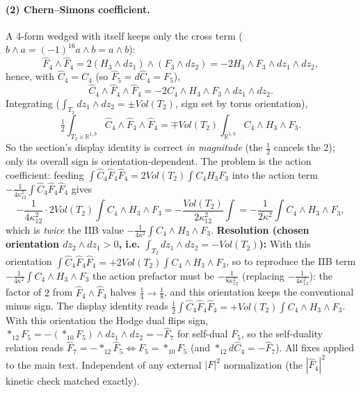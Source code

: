 \paragraph{(2) Chern--Simons coefficient.}
A 4-form wedged with itself keeps only the cross term ($b\wedge a = (-1)^{16}a\wedge b = a\wedge b$):
\begin{equation}
\hat F_4\wedge\hat F_4 = 2 (H_3\wedge dz_1)\wedge(F_3\wedge dz_2)
= -2 H_3\wedge F_3\wedge dz_1\wedge dz_2 ,
\end{equation}
hence, with $\hat C_4 = C_4$ (so $\hat F_5 = d\hat C_4 = F_5$),
\begin{equation}
\hat C_4\wedge\hat F_4\wedge\hat F_4 = -2 C_4\wedge H_3\wedge F_3\wedge dz_1\wedge dz_2 .
\end{equation}
Integrating ($\int_{T_2}dz_1\wedge dz_2 = \pm Vol(T_2)$, sign set by torus orientation),
\begin{equation}
\tfrac12\int_{T_2\times\mathbb R^{1,9}}\hat C_4\wedge\hat F_4\wedge\hat F_4
= \mp Vol(T_2)\int_{\mathbb R^{1,9}} C_4\wedge H_3\wedge F_3 .
\end{equation}
So the section's display identity is correct \emph{in magnitude} (the $\tfrac12$ cancels the $2$); only its overall
sign is orientation-dependent. The problem is the action coefficient: feeding $\int\hat C_4\hat F_4\hat F_4 = 2 Vol(T_2)\int C_4 H_3 F_3$
into the action term $-\tfrac{1}{4\kappa_{12}^2}\int\hat C_4\hat F_4\hat F_4$ gives
\begin{equation}
-\frac{1}{4\kappa_{12}^2}\cdot 2 Vol(T_2)\int C_4\wedge H_3\wedge F_3
= -\frac{Vol(T_2)}{2\kappa_{12}^2}\int = -\frac{1}{2\kappa^2}\int C_4\wedge H_3\wedge F_3 ,
\end{equation}
which is \emph{twice} the IIB value $-\tfrac{1}{4\kappa^2}\int C_4\wedge H_3\wedge F_3$.
\textbf{Resolution (chosen orientation $dz_2\wedge dz_1 > 0$, i.e. $\int_{T_2}dz_1\wedge dz_2 = -Vol(T_2)$):}
With this orientation $\int\hat C_4\hat F_4\hat F_4 = +2 Vol(T_2)\int C_4\wedge H_3\wedge F_3$, so to reproduce the IIB term
$-\tfrac{1}{4\kappa^2}\int C_4\wedge H_3\wedge F_3$ the action prefactor must be $-\tfrac{1}{8\kappa_{12}^2}$ (replacing $-\tfrac{1}{4\kappa_{12}^2}$):
the factor of $2$ from $\hat F_4\wedge\hat F_4$ halves $\tfrac14\to\tfrac18$, and this orientation keeps the conventional minus sign.
The display identity reads $\tfrac12\int\hat C_4\hat F_4\hat F_4 = +Vol(T_2)\int C_4\wedge H_3\wedge F_3$.
With this orientation the Hodge dual flips sign, $*_{12}F_5 = -(*_{10}F_5)\wedge dz_1\wedge dz_2 = -\hat F_7$ for self-dual $F_5$,
so the self-duality relation reads $\hat F_7 = -*_{12}\hat F_5 \Leftrightarrow F_5 = *_{10}F_5$ (and $*_{12}d\hat C_4 = -\hat F_7$).
All fixes applied to the main text. Independent of any external $|F|^2$ normalization (the $|\hat F_4|^2$ kinetic check matched exactly).

